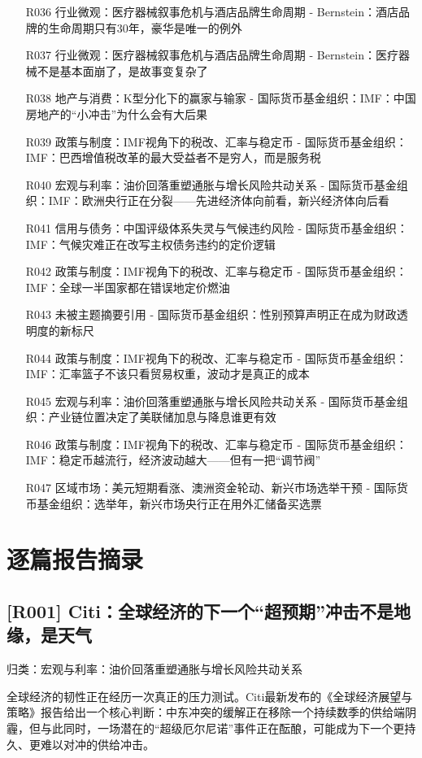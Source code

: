 \documentclass[11pt]{ctexart}
\begin{document}
\begin{itemize}
  \item [R036] 行业微观：医疗器械叙事危机与酒店品牌生命周期 - Bernstein：酒店品牌的生命周期只有30年，豪华是唯一的例外
  \item [R037] 行业微观：医疗器械叙事危机与酒店品牌生命周期 - Bernstein：医疗器械不是基本面崩了，是故事变复杂了
  \item [R038] 地产与消费：K型分化下的赢家与输家 - 国际货币基金组织：IMF：中国房地产的“小冲击”为什么会有大后果
  \item [R039] 政策与制度：IMF视角下的税改、汇率与稳定币 - 国际货币基金组织：IMF：巴西增值税改革的最大受益者不是穷人，而是服务税
  \item [R040] 宏观与利率：油价回落重塑通胀与增长风险共动关系 - 国际货币基金组织：IMF：欧洲央行正在分裂——先进经济体向前看，新兴经济体向后看
  \item [R041] 信用与债务：中国评级体系失灵与气候违约风险 - 国际货币基金组织：IMF：气候灾难正在改写主权债务违约的定价逻辑
  \item [R042] 政策与制度：IMF视角下的税改、汇率与稳定币 - 国际货币基金组织：IMF：全球一半国家都在错误地定价燃油
  \item [R043] 未被主题摘要引用 - 国际货币基金组织：性别预算声明正在成为财政透明度的新标尺
  \item [R044] 政策与制度：IMF视角下的税改、汇率与稳定币 - 国际货币基金组织：IMF：汇率篮子不该只看贸易权重，波动才是真正的成本
  \item [R045] 宏观与利率：油价回落重塑通胀与增长风险共动关系 - 国际货币基金组织：产业链位置决定了美联储加息与降息谁更有效
  \item [R046] 政策与制度：IMF视角下的税改、汇率与稳定币 - 国际货币基金组织：IMF：稳定币越流行，经济波动越大——但有一把“调节阀”
  \item [R047] 区域市场：美元短期看涨、澳洲资金轮动、新兴市场选举干预 - 国际货币基金组织：选举年，新兴市场央行正在用外汇储备买选票
\end{itemize}
\section{逐篇报告摘录}
\subsection{[R001] Citi：全球经济的下一个“超预期”冲击不是地缘，是天气}
{\small\color{refgray}归类：宏观与利率：油价回落重塑通胀与增长风险共动关系}

全球经济的韧性正在经历一次真正的压力测试。Citi最新发布的《全球经济展望与策略》报告给出一个核心判断：中东冲突的缓解正在移除一个持续数季的供给端阴霾，但与此同时，一场潜在的“超级厄尔尼诺”事件正在酝酿，可能成为下一个更持久、更难以对冲的供给冲击。
\end{document}
